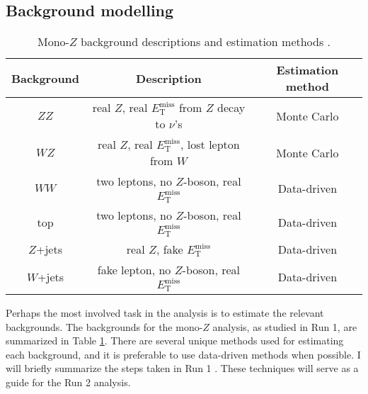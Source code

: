 \subsection{Background modelling}
\label{sec:bgest}
	
\begin{table}[h]
\centering
\begin{tabular}{|c|c|c|}
\hline
Background 				& Description												& Estimation method \\ \hline \hline
$ZZ$					& real $Z$, real $E_\text{T}^\text{miss}$ from $Z$ decay to $\nu$'s		& Monte Carlo       \\ \hline
$WZ$					& real $Z$, real $E_\text{T}^\text{miss}$, lost lepton from $W$			& Monte Carlo       \\ \hline
$WW$					& two leptons, no $Z$-boson, real $E_\text{T}^\text{miss}$			& Data-driven       \\ \hline
top        					& two leptons, no $Z$-boson, real $E_\text{T}^\text{miss}$			& Data-driven       \\ \hline
$Z$+jets   				& real $Z$, fake $E_\text{T}^\text{miss}$                           				& Data-driven       \\ \hline
$W$+jets					& fake lepton, no $Z$-boson, real $E_\text{T}^\text{miss}$         		& Data-driven       \\ \hline
\end{tabular}
\caption[Mono-$Z$ background descriptions and estimation methods]{Mono-$Z$ background descriptions and estimation methods \cite{Barberio:1529950}.}
\label{tbl:backgrounds}
\end{table}

Perhaps the most involved task in the analysis is to estimate the relevant backgrounds. The backgrounds for the mono-$Z$ analysis, as studied in Run 1, are summarized in Table \ref{tbl:backgrounds}. There are several unique methods used for estimating each background, and it is preferable to use data-driven methods when possible. I will briefly summarize the steps taken in Run 1 \cite{Barberio:1529950}. These techniques will serve as a guide for the Run 2 analysis.

